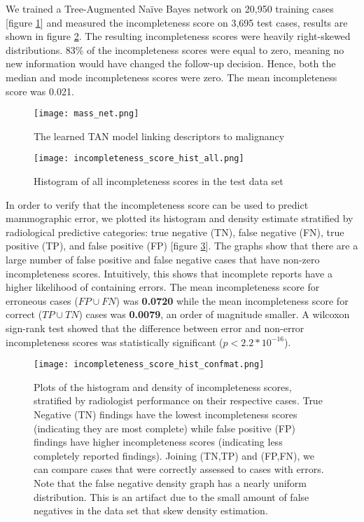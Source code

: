 We trained a Tree-Augmented Na\"{i}ve Bayes network on 20,950 training cases [figure \ref{fig:mass_net}] and measured the incompleteness score on 3,695 test cases, results are shown in figure \ref{fig:incompleteness_score_hist_all}. The resulting incompleteness scores were heavily right-skewed distributions. 83\% of the incompleteness scores were equal to zero, meaning no new information would have changed the follow-up decision. Hence, both the median and mode incompleteness scores were zero. The mean incompleteness score was 0.021.

\begin{figure}[h]
	\centering
	\texttt{[image: mass\_net.png]}
	\caption{The learned TAN model linking descriptors to malignancy}
	\label{fig:mass_net}
\end{figure}


\clearpage
\begin{figure}
\centering
\texttt{[image: incompleteness\_score\_hist\_all.png]}
\caption{Histogram of all incompleteness scores in the test data set}
\label{fig:incompleteness_score_hist_all}
\end{figure}


\clearpage
In order to verify that the incompleteness score can be used to predict mammographic error, we plotted its histogram and density estimate stratified by radiological predictive categories: true negative (TN), false negative (FN), true positive (TP), and false positive (FP) [figure \ref{fig:incompleteness_score_hist_confmat}]. The graphs show that there are a large number of false positive and false negative cases that have non-zero incompleteness scores. Intuitively, this shows that incomplete reports have a higher likelihood of containing errors. The mean incompleteness score for erroneous cases ($FP \cup FN$) was \textbf{0.0720} while the mean incompleteness score for correct ($TP \cup TN$) cases was \textbf{0.0079}, an order of magnitude smaller. A wilcoxon sign-rank test showed that the difference between error and non-error incompleteness scores was statistically significant ($p < 2.2*10^{-16}$).

\begin{figure}
\centering
\texttt{[image: incompleteness\_score\_hist\_confmat.png]}
\caption[Incompleteness scores stratified by confusion matrix]{Plots of the histogram and density of incompleteness scores, stratified by radiologist performance on their respective cases. True Negative (TN) findings have the lowest incompleteness scores (indicating they are most complete) while false positive (FP) findings have higher incompleteness scores (indicating less completely reported findings). Joining (TN,TP) and (FP,FN), we can compare cases that were correctly assessed to cases with errors. Note that the false negative density graph has a nearly uniform distribution. This is an artifact due to the small amount of false negatives in the data set that skew density estimation.}
\label{fig:incompleteness_score_hist_confmat}
\end{figure}


